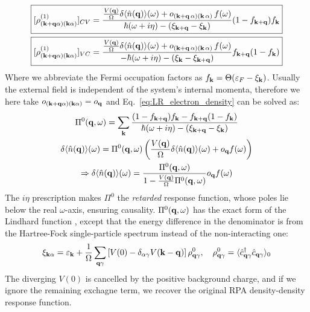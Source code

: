 \documentclass[11pt,letterpaper]{article}
\theoremstyle{definition}
\theoremstyle{plain}
\theoremstyle{remark}
\newcommand{\avg}[1]{\langle #1 \rangle}%
\newcommand{\eps}{\varepsilon}
\begin{document}
\begin{gather}
    \boxed{
        [\rho^{(1)}_{(\vb{k} + \vb{q} \alpha) (\vb{k} \alpha)}]_{CV} = \frac{\frac{V(\vb{q})}{\Omega} \delta \avg{\hat{n}(\vb{q})}(\omega) + o_{(\vb{k}+\vb{q}\,\alpha)(\vb{k}\,\alpha)}\,f(\omega)}{\hbar(\omega + i\eta) - (\xi_{\vb{k}+\vb{q}} - \xi_{\vb{k}})} (1 - f_{\vb{k} + \vb{q}}) f_{\vb{k}} 
    }\\
    \boxed{
        [\rho^{(1)}_{(\vb{k} + \vb{q} \alpha) (\vb{k} \alpha)}]_{VC} = \frac{\frac{V(\vb{q})}{\Omega} \delta \avg{\hat{n}(\vb{q})}(\omega) + o_{(\vb{k}+\vb{q}\,\alpha)(\vb{k}\,\alpha)}\,f(\omega)}{- \hbar(\omega + i\eta) - (\xi_{\vb{k}} - \xi_{\vb{k}+\vb{q}})} f_{\vb{k} + \vb{q}} (1 - f_{\vb{k}}) 
    }
\end{gather}
Where we abbreviate the Fermi occupation factors as $f_{\vb{k}} = \Theta(\eps_F - \xi_{\vb{k}})$. Usually the external field is independent of the system's internal momenta, therefore we here take $o_{(\vb{k} + \vb{q} \alpha)(\vb{k} \alpha)} = o_{\vb{q}}$ and Eq.~\eqref{eq:LR_electron_density} can be solved as:
\begin{gather}
    \Pi^0(\vb{q}, \omega) = \sum_{\vb{k}}\frac{(1-f_{\vb{k} + \vb{q}})f_{\vb{k}} - f_{\vb{k} + \vb{q}}(1-f_{\vb{k}})}{\hbar (\omega + i\eta) - (\xi_{\vb{k} + \vb{q}} - \xi_{\vb{k}})} \\
    \delta\avg{\hat{n}(\vb{q})}(\omega) = \Pi^0(\vb{q},\omega)\left(\frac{V(\vb{q})}{\Omega} \delta\avg{\hat{n}(\vb{q})}(\omega) + o_{\vb{q}} f(\omega)\right) \\
    \Rightarrow \delta\avg{\hat{n}(\vb{q})}(\omega) = \frac{\Pi^0(\vb{q},\omega)}{1 - \frac{V(\vb{q})}{\Omega} \Pi^0(\vb{q},\omega)} o_{\vb{q}} f(\omega)
\end{gather} 
The $i\eta$ prescription makes $\Pi^0$ the \emph{retarded} response function, whose poles lie below the real $\omega$-axis, ensuring causality. $\Pi^0(\vb{q},\omega)$ has the exact form of the Lindhard function \cite{FetterWalecka}, except that the energy difference in the denominator is from the Hartree-Fock single-particle spectrum instead of the non-interacting one:
\begin{gather}
    \xi_{\vb{k} \alpha} = \eps_{\vb{k}} + \frac{1}{\Omega}\sum_{\vb{q} \gamma} \left[V(0) - \delta_{\alpha \gamma} V(\vb{k} - \vb{q})\right] \rho^0_{\vb{q} \gamma}, \quad \rho^0_{\vb{q} \gamma} = \avg{\hat{c}^\dagger_{\vb{q} \gamma} \hat{c}_{\vb{q} \gamma}}_0
\end{gather}
The diverging $V(0)$ is cancelled by the positive background charge, and if we ignore the remaining exchagne term, we recover the original RPA density-density response function.





\end{document}

